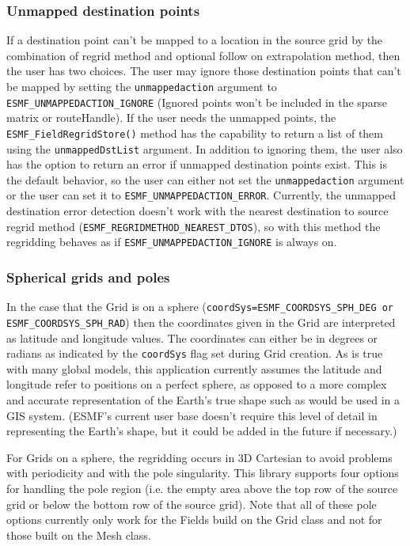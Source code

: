 \subsubsection{Unmapped destination points}
 If a destination point can't be mapped to a location in the source grid by the combination of regrid method and 
 optional follow on extrapolation method, then the user has two choices. The user may ignore those destination points
 that can't be mapped by setting the {\tt unmappedaction} argument to {\tt ESMF\_UNMAPPEDACTION\_IGNORE} (Ignored points won't be included in
 the sparse matrix or routeHandle). If the user needs the unmapped points, the {\tt ESMF\_FieldRegridStore()} method has the capability to return
 a list of them using the {\tt unmappedDstList} argument.  In addition to ignoring them, the user also has the option to return
 an error if unmapped destination points exist. This is the default behavior, so the user can either not set the {\tt unmappedaction} argument
 or the user can set it to {\tt ESMF\_UNMAPPEDACTION\_ERROR}. Currently, the unmapped destination error detection doesn't 
 work with the nearest destination to source regrid method ({\tt ESMF\_REGRIDMETHOD\_NEAREST\_DTOS}), so with this method the regridding 
 behaves as if {\tt ESMF\_UNMAPPEDACTION\_IGNORE} is always on. 


\subsubsection{Spherical grids and poles}
In the case that the Grid is on a sphere ({\tt coordSys=ESMF\_COORDSYS\_SPH\_DEG or ESMF\_COORDSYS\_SPH\_RAD})
then the coordinates given in the Grid are interpreted as latitude and longitude values. The coordinates can either be in degrees or radians as indicated by the 
{\tt coordSys} flag set during Grid creation. As is true with many global models, this application currently assumes the latitude and longitude refer to positions on a 
perfect sphere, as opposed to a more complex and accurate representation of the Earth's true shape such as would be used in a GIS system. (ESMF's current user base doesn't 
require this level of detail in representing the Earth's shape, but it could be added in the future if necessary.)

For Grids on a sphere, the regridding occurs in 3D Cartesian to avoid
problems with periodicity and with the pole singularity. This library
 supports four options for handling the pole region (i.e. the empty area above the top row of the source grid or below
 the bottom row of the source grid).  Note that all of these pole options currently only work for the Fields build on the Grid class and not for those built on 
 the Mesh class. 

